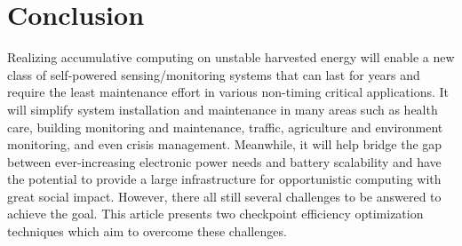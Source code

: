 \section{Conclusion}
Realizing accumulative computing on unstable harvested energy will enable a new class of self-powered sensing/monitoring systems that can last for years and require the least maintenance effort in various non-timing critical applications. It will simplify system installation and maintenance in many areas such as health care, building monitoring and maintenance, traffic, agriculture and environment monitoring, and even crisis management. Meanwhile, it will help bridge the gap between ever-increasing electronic power needs and battery scalability and have the potential to provide a large infrastructure for opportunistic computing with great social impact. However, there all still several challenges to be answered to achieve the goal. This article presents two checkpoint efficiency optimization techniques which aim to overcome these challenges.

